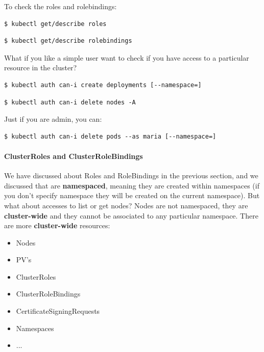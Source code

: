 \documentclass{article}
\newenvironment{codetemplate}[1][]{%
  \mybasecolorbox[#1]
  \itshape
}{%
  \endmybasecolorbox
}
\begin{document}
To check the roles and rolebindings:
\begin{codetemplate}{}
\begin{verbatim}
$ kubectl get/describe roles
\end{verbatim}
\end{codetemplate}
\begin{codetemplate}{}
\begin{verbatim}
$ kubectl get/describe rolebindings
\end{verbatim}
\end{codetemplate}

What if you like a simple user want to check if you have access to a particular resource in the cluster?
\begin{codetemplate}{}
\begin{verbatim}
$ kubectl auth can-i create deployments [--namespace=]
\end{verbatim}
\end{codetemplate}
\begin{codetemplate}{}
\begin{verbatim}
$ kubectl auth can-i delete nodes -A
\end{verbatim}
\end{codetemplate}

Just if you are admin, you can:
\begin{codetemplate}{}
\begin{verbatim}
$ kubectl auth can-i delete pods --as maria [--namespace=]
\end{verbatim}
\end{codetemplate}

\paragraph{ClusterRoles and ClusterRoleBindings}
We have discussed about Roles and RoleBindings in the previous section, and we discussed that are \textbf{namespaced}, meaning they are created within namespaces (if you don't specify namespace they will be created on the current namespace). But what about accesses to list or get nodes? Nodes are not namespaced, they are \textbf{cluster-wide} and they cannot be associated to any particular namespace. There are more \textbf{cluster-wide} resources:
\begin{itemize}
    \item Nodes
    \item PV's
    \item ClusterRoles
    \item ClusterRoleBindings
    \item CertificateSigningRequests
    \item Namespaces
    \item ...
\end{itemize}
\end{document}
